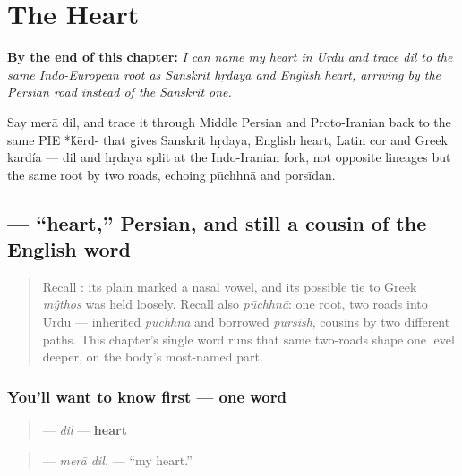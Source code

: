 
\chapter{The Heart}
\label{ch:ur-heart}

\begin{chapteropening}
\textbf{By the end of this chapter:} \emph{I can name my heart in Urdu and trace dil to the same Indo-European root as Sanskrit hṛdaya and English heart, arriving by the Persian road instead of the Sanskrit one.}

Say merā dil, and trace it through Middle Persian and Proto-Iranian back to the same PIE *\'{k}ērd- that gives Sanskrit hṛdaya, English heart, Latin cor and Greek kardía — dil and hṛdaya split at the Indo-Iranian fork, not opposite lineages but the same root by two roads, echoing pūchhnā and porsīdan.
\end{chapteropening}

\section[\texorpdfstring{\ur{دل} (dil)}{دل (dil)}]{ — \textquotedblleft{}heart,\textquotedblright{} Persian, and still a cousin of the English word}

\label{lesson:UR-C11-dil}



\begin{quote}
Recall \textbf{}: its plain \textbf{} marked a nasal vowel, and its possible tie to Greek \emph{mŷthos} was held loosely. Recall also \emph{pūchhnā}: one root, two roads into Urdu — inherited \emph{pūchhnā} and borrowed \emph{pursish}, cousins by two different paths. This chapter's single word runs that same two-roads shape one level deeper, on the body's most-named part.
\end{quote}

\subsection*{You'll want to know first — one word}
\begin{quote}
\textbf{} — \emph{dil} — \textbf{heart}
\end{quote}

\begin{quote}
\textbf{ } — \emph{merā dil.} — \textquotedblleft{}my heart.\textquotedblright{}
\end{quote}

